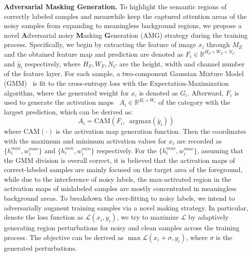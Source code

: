 \documentclass[10pt,twocolumn,letterpaper]{article}
\begin{document}
\textbf{Adversarial Masking Generation.} To highlight the semantic regions of correctly labeled samples and meanwhile keep the captured attention areas of the noisy samples from expanding to meaningless background regions, we propose a novel \textbf{A}dversarial noisy \textbf{M}asking \textbf{G}eneration (AMG) strategy during the training process. Specifically, we begin by extracting the feature of image $x_i$ through $M_E$ and the obtained feature map and prediction are denoted as $F_i \in \mathbb{R}^{H_F\times W_F\times N_C}$ and $\widetilde{y_i}$ respectively, where $H_F, W_F, N_C$ are the height, width and channel number of the feature layer. For each sample, a two-component Gaussian Mixture Model (GMM)~\cite{permuter2006study} is fit to the cross-entropy loss with the Expectation-Maximization algorithm, where the generated weight for $x_i$ is denoted as $G_i$. Afterward, $F_i$ is used to generate the activation maps~\cite{gradCAM} $A_i \in \mathbb{R}^{H_i\times W_i}$ of the category with the largest prediction, which can be derived as:
\begin{equation}
    A_i = \text{CAM}(F_i, \enspace \text{argmax}(\widetilde{y_i}))
    \label{eq:activation}
\end{equation}
where $\text{CAM}(\cdot)$ is the activation map generation function. Then the coordinates with the maximum and minimum activation values for $x_i$ are recorded as $\{{h}_i ^{max}, {w}_i ^{max}\}$ and $\{{h}_i ^{min}, {w}_i ^{min}\}$ respectively. For the $\{{h}_i ^{max}, {w}_i ^{max}\}$, assuming that the GMM division is overall correct, it is believed that the activation maps of correct-labeled samples are mainly focused on the target area of the foreground, while due to the interference of noisy labels, the max-activated region in the activation maps of mislabeled samples are mostly concentrated in meaningless background areas. 
{To breakdown the over-fitting to noisy labels, we intend to adversarially augment training samples via a novel making strategy. In particular, denote the loss function as $\mathcal{L}(x_i,y_i)$, we try to maximize $\mathcal{L}$ by adaptively generating region perturbations for noisy and clean samples across the training process. The objective can be derived as $\max \mathcal{L}(x_i+\sigma, y_i)$, where $\sigma$ is the generated perturbations. }
\end{document}
